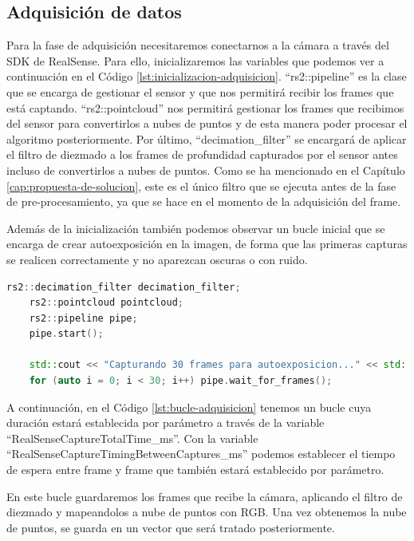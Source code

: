 \subsection{Adquisición de datos}

Para la fase de adquisición necesitaremos conectarnos a la cámara a través del SDK de RealSense. Para ello, inicializaremos las variables que podemos ver a continuación en el Código \ref{lst:inicializacion-adquisicion}.
``rs2::pipeline'' es la clase que se encarga de gestionar el sensor y que nos permitirá recibir los frames que está captando.
``rs2::pointcloud'' nos permitirá gestionar los frames que recibimos del sensor para convertirlos a nubes de puntos y de esta manera poder procesar el algoritmo posteriormente.
Por último, ``decimation\_filter'' se encargará de aplicar el filtro de diezmado a los frames de profundidad capturados por el sensor antes incluso de convertirlos a nubes de puntos.
Como se ha mencionado en el Capítulo \ref{cap:propuesta-de-solucion}, este es el único filtro que se ejecuta antes de la fase de pre-procesamiento, ya que se hace en el momento de la adquisición del frame.

Además de la inicialización también podemos observar un bucle inicial que se encarga de crear autoexposición en la imagen, de forma que las primeras capturas se realicen correctamente y no aparezcan oscuras o con ruido.

\begin{lstlisting}[language={C++}, caption={Inicialización del sensor RealSense D435 para la adquisición de datos}, label={lst:inicializacion-adquisicion}]
    rs2::decimation_filter decimation_filter;
    rs2::pointcloud pointcloud;
    rs2::pipeline pipe;
    pipe.start();

    std::cout << "Capturando 30 frames para autoexposicion..." << std::endl;
    for (auto i = 0; i < 30; i++) pipe.wait_for_frames();
\end{lstlisting}

A continuación, en el Código \ref{lst:bucle-adquisicion} tenemos un bucle cuya duración estará establecida por parámetro a través de la variable ``RealSenseCaptureTotalTime\_ms''.
Con la variable ``RealSenseCaptureTimingBetweenCaptures\_ms'' podemos establecer el tiempo de espera entre frame y frame que también estará establecido por parámetro.

En este bucle guardaremos los frames que recibe la cámara, aplicando el filtro de diezmado y mapeandolos a nube de puntos con RGB. Una vez obtenemos la nube de puntos, se guarda en un vector que será tratado posteriormente.

